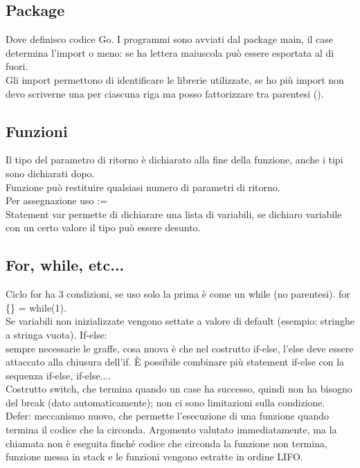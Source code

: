 \documentclass{article}
\begin{document}
\subsection{Package}
Dove definisco codice Go. I programmi sono avviati dal package main, il case determina l'import o meno: se ha lettera maiuscola può essere esportata al di fuori.\\ Gli import permettono di identificare le librerie utilizzate, se ho più import non devo scriverne una per ciascuna riga ma posso fattorizzare tra parentesi ().
\subsection{Funzioni}
Il tipo del parametro di ritorno è dichiarato alla fine della funzione, anche i tipi sono dichiarati dopo.\\ Funzione può restituire qualsiasi numero di parametri di ritorno.\\ Per assegnazione uso :=\\ Statement var permette di dichiarare una lista di variabili, se dichiaro variabile con un certo valore il tipo può essere desunto.
\subsection{For, while, etc...}
Ciclo for ha 3 condizioni, se uso solo la prima è come un while (no parentesi). for \{\} = while(1).\\ Se variabili non inizializzate vengono settate a valore di default (esempio: stringhe a stringa vuota).
If-else: \\ sempre necessarie le graffe, cosa nuova è che nel costrutto if-else, l'else deve essere attaccato alla chiusura dell'if. È possibile combinare più statement if-else con la sequenza if-else, if-else....\\ Costrutto switch, che termina quando un case ha successo, quindi non ha bisogno del break (dato automaticamente); non ci sono limitazioni sulla condizione.\\ Defer: meccanismo nuovo, che permette l'esecuzione di una funzione quando termina il codice che la circonda. Argomento valutato immediatamente, ma la chiamata non è eseguita finché codice che circonda la funzione non termina, funzione messa in stack e le funzioni vengono estratte in ordine LIFO.
\end{document}
